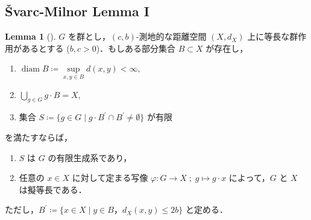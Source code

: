 \documentclass[dvipdfmx]{ujarticle}
\DeclareMathOperator{\diam}{diam}
\theoremstyle{definition}
\newtheorem{lem}[dfn]{Lemma}
\begin{document}
\subsection{Švarc-Milnor Lemma I}
\begin{lem}[{\cite[Proposition 5.4.1]{1}}]\label{svarc}
$G$ を群とし，$(c,b)$-測地的な距離空間 $(X,d_X)$ 上に等長な群作用があるとする ($b,c>0$)．もしある部分集合 $B\subset X$ が存在し，
   \begin{enumerate}
   \item[(a)] $\diam B\coloneqq\underset{x,y\in B}{\sup}d(x,y)<\infty,$
   \item[(b)] $\bigcup_{g\in G}g\cdot B=X,$
   \item[(c)] 集合 $S\coloneqq\{g\in G\mid g\cdot B^\prime \cap B^\prime \neq \emptyset\}$ が有限
   \end{enumerate}
 を満たすならば，
 \begin{enumerate}
  \item $S$ は $G$ の有限生成系であり，\label{S_is_generating_set}
\item 任意の $x\in X$ に対して定まる写像 $\varphi\colon G\rightarrow X\;;\; g\mapsto g\cdot x$ によって，$G$ と $X$ は擬等長である．\label{G~X}
 \end{enumerate}
ただし，$B^\prime \coloneqq\{x\in X\mid y\in B，d_X(x,y)\leq 2b\}$ と定める．
\end{lem}
\end{document}
